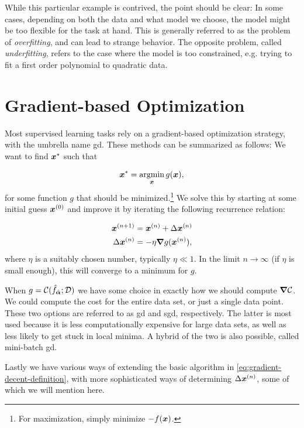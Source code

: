 \documentclass[Thesis.tex]{subfiles}
\begin{document}
While this particular example is contrived, the point should be clear: In
some cases, depending on both the data and what model we choose, the model might
be too flexible for the task at hand. This is generally referred to as the
problem of \emph{overfitting}, and can lead to strange behavior. The opposite
problem, called \emph{underfitting}, refers to the case where the model is too
constrained, e.g. trying to fit a first order polynomial to
quadratic data.



\section{Gradient-based Optimization}
\label{sec:ml-optimization}

Most supervised learning tasks rely on a gradient-based optimization strategy,
with the umbrella name \gls{gd}.
These methods can be summarized as follows: We want to find $\bm{x}^*$ such that

\begin{align}
  \bm{x}^* = \operatorname*{argmin}_{\bm{x}} g(\bm{x}),
\end{align}
for some function $g$ that should be minimized.\footnote{For maximization, simply minimize $-f(\bm{x})$. }
We solve this by starting at some initial guess $\bm{x}^{(0)}$ and improve it by
iterating the following recurrence relation:

\begin{align}
  \begin{split}\label{eq:gradient-decent-definition}
    \bm{x}^{(n+1)} &= \bm{x}^{(n)} + \Delta \bm{x}^{(n)} \\
    \Delta\bm{x}^{(n)} &= -\eta \grad{g}(\bm{x}^{(n)}),
  \end{split}
\end{align}
where $\eta$ is a suitably chosen number, typically $\eta \ll 1$. In the
limit $n\to\infty$ (if $\eta$ is small enough), this will converge to a minimum
for $g$.

When $g=\mathcal{C}(\hat f_{\hat{\bm{\alpha}}}; \mathcal{D})$ we have some choice in
exactly how we should compute $\grad{\mathcal{C}}$. We could compute the cost
for the entire data set, or just a single data point. These two options are
referred to as \gls{gd} and \gls{sgd}, respectively. The latter is most
used because it is less computationally expensive for large data sets, as well
as less likely to get stuck in local minima. A hybrid of the two is also
possible, called mini-batch \gls{gd}.

Lastly we have various ways of extending the basic algorithm in
\cref{eq:gradient-decent-definition}, with more sophisticated ways of
determining $\Delta \bm{x}^{(n)}$, some of which we will mention here.
\end{document}
